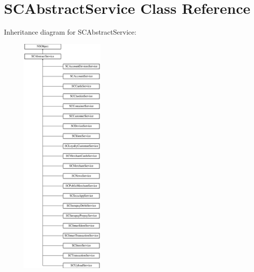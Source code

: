 \hypertarget{interface_s_c_abstract_service}{}\section{S\+C\+Abstract\+Service Class Reference}
\label{interface_s_c_abstract_service}
Inheritance diagram for S\+C\+Abstract\+Service\+:\begin{figure}[H]
\begin{center}
\leavevmode
\includegraphics[height=12.000000cm]{interface_s_c_abstract_service}
\end{center}
\end{figure}
